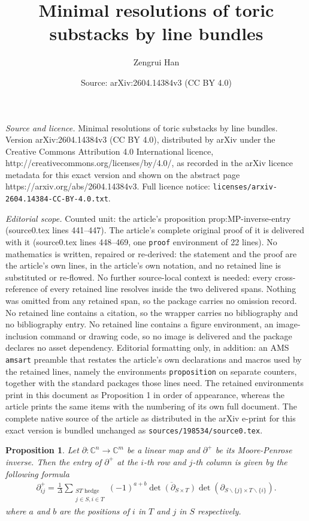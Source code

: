 \documentclass[10pt,a4paper]{amsart}
\title{Minimal resolutions of toric substacks by line bundles}
\author{Zengrui Han}
\date{Source: arXiv:2604.14384v3 (CC BY 4.0)}
\newtheorem{proposition}{Proposition}
\def\C {{\mathbb C}}
\begin{document}
\maketitle

\noindent\emph{Source and licence.} Minimal resolutions of toric substacks by line bundles. Version arXiv:2604.14384v3 (CC BY 4.0), distributed by arXiv under the Creative Commons Attribution 4.0 International licence, http://creativecommons.org/licenses/by/4.0/, as recorded in the arXiv licence metadata for this exact version and shown on the abstract page https://arxiv.org/abs/2604.14384v3. Full licence notice: \texttt{licenses/arxiv-2604.14384-CC-BY-4.0.txt}.\par\smallskip

\noindent\textit{Editorial scope.} Counted unit: the article's proposition prop:MP-inverse-entry (source0.tex lines 441--447). The article's complete original proof of it is delivered with it (source0.tex lines 448--469, one \texttt{proof} environment of 22 lines). No mathematics is written, repaired or re-derived: the statement and the proof are the article's own lines, in the article's own notation, and no retained line is substituted or re-flowed.  No further source-local context is needed: every cross-reference of every retained line resolves inside the two delivered spans.  Nothing was omitted from any retained span, so the package carries no omission record.  No retained line contains a citation, so the wrapper carries no bibliography and no bibliography entry.  No retained line contains a figure environment, an image-inclusion command or drawing code, so no image is delivered and the package declares no asset dependency.  Editorial formatting only, in addition: an AMS \texttt{amsart} preamble that restates the article's own declarations and macros used by the retained lines, namely the environments \texttt{proposition} on separate counters, together with the standard packages those lines need.  The retained environments print in this document as Proposition 1 in order of appearance, whereas the article prints the same items with the numbering of its own full document.  The complete native source of the article as distributed in the arXiv e-print for this exact version is bundled unchanged as \texttt{sources/198534/source0.tex}.
\begin{proposition}\label{prop:MP-inverse-entry}
    Let $\partial:\C^n\rightarrow\C^m$ be a linear map and $\partial^+$ be its Moore-Penrose inverse. Then the entry of $\partial^+$ at the $i$-th row and $j$-th column is given by the following formula
    \begin{align*}
        \partial^+_{ij} = \frac{1}{\Delta}\sum_{\substack{ ST \text{ hedge} \\ j\in S, i\in T}} (-1)^{a+b} \overline{\det(\partial_{S\times T})}\det(\partial_{S\backslash\{j\}\times T\backslash\{i\}}).
    \end{align*}
    where $a$ and $b$ are the positions of $i$ in $T$ and $j$ in $S$ respectively.
\end{proposition}
\end{document}
